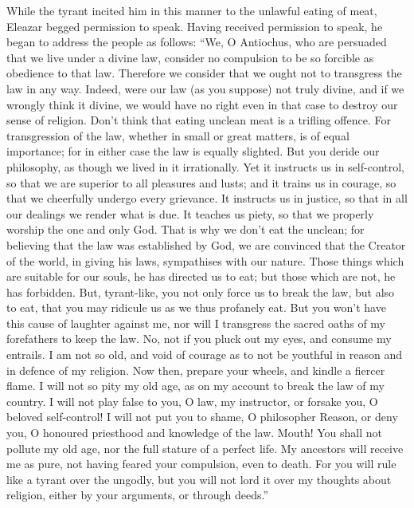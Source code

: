  While the tyrant incited him in this manner to the
unlawful eating of meat, Eleazar begged permission to speak.
 Having received permission to speak, he began to address
the people as follows:  ``We, O Antiochus, who are
persuaded that we live under a divine law, consider no compulsion to be
so forcible as obedience to that law.  Therefore we
consider that we ought not to transgress the law in any way.
 Indeed, were our law (as you suppose) not truly divine,
and if we wrongly think it divine, we would have no right even in that
case to destroy our sense of religion.  Don't think that
eating unclean meat is a trifling offence.  For
transgression of the law, whether in small or great matters, is of equal
importance;  for in either case the law is equally
slighted.  But you deride our philosophy, as though we
lived in it irrationally.  Yet it instructs us in
self-control, so that we are superior to all pleasures and lusts; and it
trains us in courage, so that we cheerfully undergo every grievance.
 It instructs us in justice, so that in all our dealings we
render what is due. It teaches us piety, so that we properly worship the
one and only God.  That is why we don't eat the unclean;
for believing that the law was established by God, we are convinced that
the Creator of the world, in giving his laws, sympathises with our
nature.  Those things which are suitable for our souls, he
has directed us to eat; but those which are not, he has forbidden.
 But, tyrant-like, you not only force us to break the law,
but also to eat, that you may ridicule us as we thus profanely eat.
 But you won't have this cause of laughter against me,
 nor will I transgress the sacred oaths of my forefathers
to keep the law.  No, not if you pluck out my eyes, and
consume my entrails.  I am not so old, and void of courage
as to not be youthful in reason and in defence of my religion.
 Now then, prepare your wheels, and kindle a fiercer flame.
 I will not so pity my old age, as on my account to break
the law of my country.  I will not play false to you, O
law, my instructor, or forsake you, O beloved self-control!
 I will not put you to shame, O philosopher Reason, or deny
you, O honoured priesthood and knowledge of the law. 
Mouth! You shall not pollute my old age, nor the full stature of a
perfect life.  My ancestors will receive me as pure, not
having feared your compulsion, even to death.  For you will
rule like a tyrant over the ungodly, but you will not lord it over my
thoughts about religion, either by your arguments, or through deeds.''

